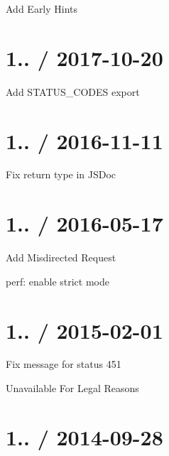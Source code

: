 
\begin{DoxyItemize}
\item Add { Early Hints}
\end{DoxyItemize}

\section*{1.. / 2017-\/10-\/20 }


\begin{DoxyItemize}
\item Add {\ttfamily S\+T\+A\+T\+U\+S\+\_\+\+C\+O\+D\+ES} export
\end{DoxyItemize}

\section*{1.. / 2016-\/11-\/11 }


\begin{DoxyItemize}
\item Fix return type in J\+S\+Doc
\end{DoxyItemize}

\section*{1.. / 2016-\/05-\/17 }


\begin{DoxyItemize}
\item Add { Misdirected Request}
\item perf\+: enable strict mode
\end{DoxyItemize}

\section*{1.. / 2015-\/02-\/01 }


\begin{DoxyItemize}
\item Fix message for status 451
\begin{DoxyItemize}
\item { Unavailable For Legal Reasons}
\end{DoxyItemize}
\end{DoxyItemize}

\section*{1.. / 2014-\/09-\/28 }


